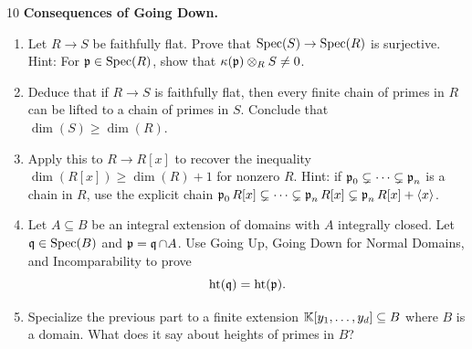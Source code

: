 \documentclass[Notebook.tex]{subfiles}
\begin{document}
\begin{problem}{10}
    \textbf{Consequences of Going Down.} 

    \begin{enumerate}
        \item Let $R\to S$ be faithfully flat. Prove that $\operatorname{Spec}(S)\to\operatorname{Spec}(R)$ is surjective. Hint: For $\operatorname{\mathfrak{p}}\in\operatorname{Spec}(R)$, show that $\kappa(\operatorname{\mathfrak{p}})\otimes_R S\neq 0$.
        \item Deduce that if $R\to S$ is faithfully flat, then every finite chain of primes in $R$ can be lifted to a chain of primes in $S$. Conclude that $\dim(S)\geq \dim(R)$.
        \item Apply this to $R\to R[x]$ to recover the inequality $\dim(R[x])\geq \dim(R)+1$ for nonzero $R$. Hint: if $\operatorname{\mathfrak{p}}_0\subsetneq\cdots\subsetneq\operatorname{\mathfrak{p}}_n$ is a chain in $R$, use the explicit chain $\operatorname{\mathfrak{p}}_0R[x]\subsetneq\cdots\subsetneq\operatorname{\mathfrak{p}}_nR[x]\subsetneq\operatorname{\mathfrak{p}}_nR[x]+\langle x\rangle$.
        \item Let $A\subseteq B$ be an integral extension of domains with $A$ integrally closed. Let $\operatorname{\mathfrak{q}}\in\operatorname{Spec}(B)$ and $\operatorname{\mathfrak{p}}=\operatorname{\mathfrak{q}}\cap A$. Use Going Up, Going Down for Normal Domains, and Incomparability to prove
        \[
        \operatorname{\text{ht}}(\operatorname{\mathfrak{q}})=\operatorname{\text{ht}}(\operatorname{\mathfrak{p}}).
        \]
        \item Specialize the previous part to a finite extension $\mathbb K[y_1,\ldots,y_d]\subseteq B$ where $B$ is a domain. What does it say about heights of primes in $B$?
    \end{enumerate}
\end{problem}
\end{document}

